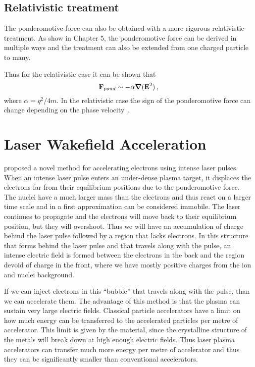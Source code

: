 \documentclass[12pt, class=report, crop=false]{standalone}
\begin{document}
\subsection{Relativistic treatment}

The ponderomotive force can also be obtained with a more rigorous relativistic
treatment. As \Textcite{mulser_highpower_2010} show in Chapter 5, the ponderomotive
force can be derived in multiple ways and the treatment can also be extended from
one charged particle to many.

Thus for the relativistic case it can be shown that
\[
\vb{F}_{pond} \sim -\alpha \grad{(\vb{E}^2)}\,,
\]
where \(\alpha=q^2/4m\). In the relativistic case the sign of the ponderomotive
force can change depending on the phase velocity~\autocite[205]{mulser_highpower_2010}.

\section{Laser Wakefield Acceleration}

\Textcite{tajima_laserelectron_1979} proposed a novel method for accelerating
electrons using intense laser pulses.
When an intense laser pulse enters an under-dense plasma target,
it displaces the electrons far from their equilibrium positions
due to the ponderomotive force. The nuclei have a much larger
mass than the electrons and thus react on a larger time scale
and in a first approximation can be considered immobile.
The laser continues to propagate and the electrons will move
back to their equilibrium position, but they will overshoot.
Thus we will have an accumulation of charge behind the laser pulse
followed by a region that lacks electrons. In this structure
that forms behind the laser pulse and that travels along with
the pulse, an intense electric field is formed between the electrons
in the back and the region devoid of charge in the front, where
we have mostly positive charges from the ion and nuclei background.

If we can inject electrons in this ``bubble'' that travels along
with the pulse, than we can accelerate them. The advantage of this
method is that the plasma can sustain very large electric fields.
Classical particle accelerators have a limit on how much energy
can be transferred to the accelerated particles per metre of
accelerator. This limit is given by the material, since the
crystalline structure of the metals will break down at high enough
electric fields. Thus laser plasma accelerators can transfer much
more energy per metre of accelerator and thus they can be
significantly smaller than conventional accelerators.
\end{document}
